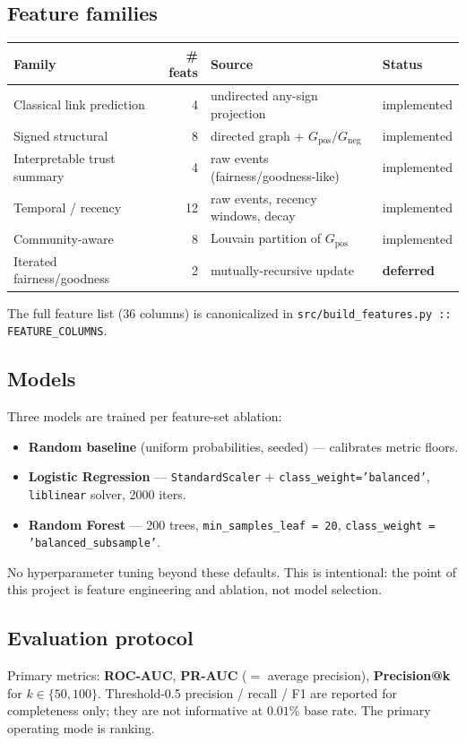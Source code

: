 \documentclass[11pt,a4paper]{article}
\newcommand{\code}[1]{\texttt{#1}}
\begin{document}
\subsection{Feature families}
\begin{center}
\small
\begin{tabular}{lrll}
\toprule
Family & \# feats & Source & Status \\
\midrule
Classical link prediction    & 4 & undirected any-sign projection        & implemented \\
Signed structural            & 8 & directed graph + $G_{\mathrm{pos}}/G_{\mathrm{neg}}$ & implemented \\
Interpretable trust summary  & 4 & raw events (fairness/goodness-like)   & implemented \\
Temporal / recency           & 12 & raw events, recency windows, decay   & implemented \\
Community-aware              & 8 & Louvain partition of $G_{\mathrm{pos}}$ & implemented \\
Iterated fairness/goodness   & 2 & mutually-recursive update             & \textbf{deferred} \\
\bottomrule
\end{tabular}
\end{center}
The full feature list (36 columns) is canonicalized in
\code{src/build\_features.py :: FEATURE\_COLUMNS}.

\subsection{Models}
Three models are trained per feature-set ablation:
\begin{itemize}[nosep]
  \item \textbf{Random baseline} (uniform probabilities, seeded) --- calibrates
        metric floors.
  \item \textbf{Logistic Regression} --- \code{StandardScaler} $+$
        \code{class\_weight='balanced'}, \code{liblinear} solver, 2000 iters.
  \item \textbf{Random Forest} --- 200 trees,
        \code{min\_samples\_leaf = 20},
        \code{class\_weight = 'balanced\_subsample'}.
\end{itemize}
No hyperparameter tuning beyond these defaults. This is intentional: the
point of this project is feature engineering and ablation, not model
selection.

\subsection{Evaluation protocol}
Primary metrics: \textbf{ROC-AUC}, \textbf{PR-AUC} ($=$ average precision),
\textbf{Precision@k} for $k \in \{50, 100\}$. Threshold-0.5
precision / recall / F1 are reported for completeness only; they are not
informative at $0.01\%$ base rate. The primary operating mode is ranking.
\end{document}
